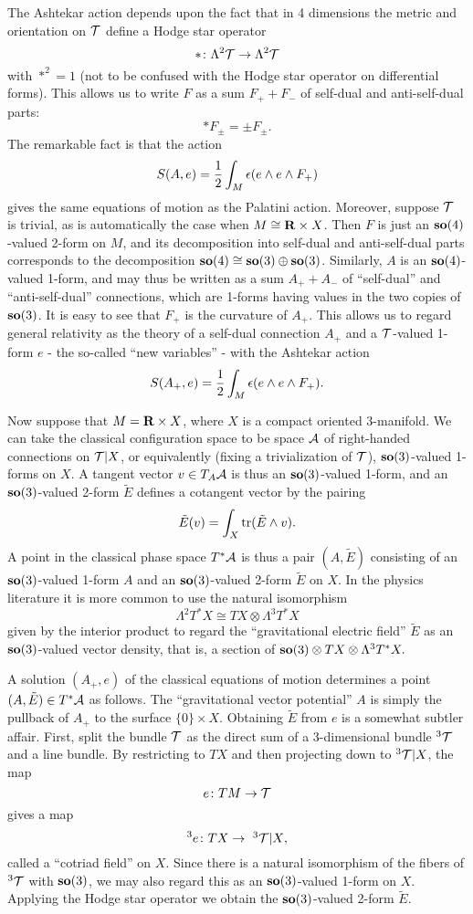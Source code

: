 \documentclass[12pt]{article}
\newcommand{\eps}{\epsilon}
\newcommand{\tensor}{\otimes}
\newcommand{\maps}{\colon}
\newcommand{\A}{{\cal A}}
\newcommand{\T}{{\cal T}}
\newcommand{\so}{{\bf so}}      %
\newcommand{\R}{{\bf R}}
\newcommand{\hf}{{1\over 2}}
\newcommand{\tr}{{\rm tr}}
\begin{document}
The Ashtekar action depends upon the fact that in 4 dimensions the metric
and orientation on $\T$ define a Hodge star operator
\[           \ast \maps \Lambda^2 \T \to \Lambda^2 \T \]
with $\ast^2 = 1$ (not to be confused with the Hodge star operator on
differential forms).   This allows us to write $F$ as a sum  $F_+
+ F_-$ of self-dual and anti-self-dual parts:
\[\ast F_{\pm} = \pm F_{\pm}.\]
The remarkable fact is that the action
\[        S(A,e) = \hf \int_M  \eps(e \wedge e \wedge F_+) \]
gives the same equations of motion as
the Palatini action.  Moreover, suppose $\T$ is trivial, as is
automatically the case when $M \cong \R \times X$.
Then $F$ is just an $\so(4)$-valued 2-form on
$M$, and its decomposition into self-dual and anti-self-dual parts
corresponds to the decomposition $\so(4) \cong \so(3) \oplus \so(3)$.
Similarly, $A$ is an $\so(4)$-valued 1-form, and may  thus be written as a
sum $A_+ + A_-$ of ``self-dual'' and ``anti-self-dual'' connections, which
are 1-forms having values in the two copies of $\so(3)$.   It is easy to
see that $F_+$ is the curvature of $A_+$.  This allows us to  regard
general relativity as the theory of a self-dual connection $A_+$ and a
$\T$-valued 1-form  $e$ - the so-called ``new variables'' - with the Ashtekar
action
\[        S(A_+,e) = \hf \int_M \eps(e \wedge e \wedge F_+) .\]

Now suppose that $M = \R \times X$, where $X$ is a compact oriented
3-manifold.  We can take the
classical configuration space to be space $\A$ of right-handed connections
on $\T|X$, or equivalently (fixing a trivialization of $\T$),
$\so(3)$-valued 1-forms on $X$.  A tangent vector $v \in T_A\A$ is thus an
$\so(3)$-valued 1-form, and an $\so(3)$-valued 2-form $\tilde E$ defines a
cotangent vector by the pairing
\[        \tilde E(v) = \int_X \tr(\tilde E\wedge v) .\]
A point in the classical phase space $T^\ast \A$ is thus a pair $(A,\tilde
E)$ consisting of an $\so(3)$-valued 1-form $A$ and an $\so(3)$-valued
2-form $\tilde E$ on $X$.
In the physics literature it is more common to use the natural isomorphism
\[         \Lambda^2 T^\ast X \cong TX \tensor \Lambda^3 T^\ast X \]
given by the interior product to regard the ``gravitational electric
field'' $\tilde E$ as an $\so(3)$-valued vector density, that is, a section
of $\so(3) \tensor TX \tensor \Lambda^3 T^\ast X .$

A solution $(A_+,e)$ of the classical equations of motion determines a
point $(A,\tilde E) \in T^\ast \A$ as follows.   The ``gravitational vector
potential'' $A$ is simply the
pullback of $A_+$ to the surface $\{0\} \times X$.  Obtaining $\tilde E$
from $e$ is a somewhat subtler affair.  First, split the bundle $\T$ as the
direct sum of a 3-dimensional bundle $^3\T$ and a line bundle.
By restricting to $TX$ and then projecting down to $^3\T|X$, the map
\[      e \maps TM \to \T \]
gives a map
\[       ^3 e \maps TX \to \hbox{ $^3\T|X$}, \]
called a ``cotriad field'' on $X$.  Since there is a natural isomorphism of
the fibers of $^3\T$ with $\so(3)$, we may also regard this as an
$\so(3)$-valued 1-form on $X$.  Applying the Hodge star operator we obtain
the $\so(3)$-valued 2-form $\tilde E$.
\end{document}
